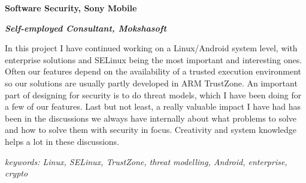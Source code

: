 \item[2014-] \textbf{Software Security, Sony Mobile}

\textit{\textbf{Self-employed Consultant, Mokshasoft}}

In this project I have continued working on a Linux/Android system level, with enterprise solutions and SELinux being the most important and interesting ones. Often our features depend on the availability of a trusted execution environment so our solutions are usually partly developed in ARM TrustZone. An important part of designing for security is to do threat models, which I have been doing for a few of our features. Last but not least, a really valuable impact I have had has been in the discussions we always have internally about what problems to solve and how to solve them with security in focus. Creativity and system knowledge helps a lot in these discussions.

\textit{keywords: Linux, SELinux, TrustZone, threat modelling, Android, enterprise, crypto}